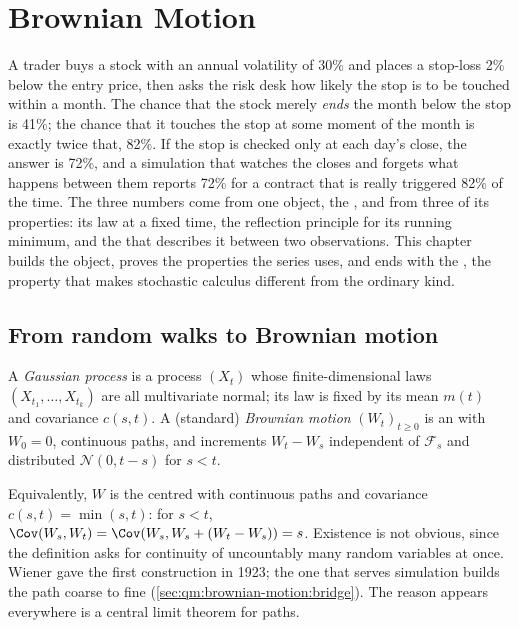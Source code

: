 \chapter{Brownian Motion}\label{ch:qm:brownian-motion}

A trader buys a stock with an annual volatility of 30\% and places a stop-loss 2\% below the
entry price, then asks the risk desk how likely the stop is to be touched within a month. The
chance that the stock merely \emph{ends} the month below the stop is 41\%; the chance that it
touches the stop at some moment of the month is exactly twice that, 82\%. If the stop is
checked only at each day's close, the answer is 72\%, and a simulation that watches the
closes and forgets what happens between them reports 72\% for a contract that is really
triggered 82\% of the time. The three numbers come from one object, the , and
from three of its properties: its law at a fixed time, the reflection principle for its
running minimum, and the  that describes it between two observations. This
chapter builds the object, proves the properties the series uses, and ends with the
, the property that makes stochastic calculus different from the
ordinary kind.

\section{From random walks to Brownian motion}

\begin{definition}\label{def:qm:brownian-motion:bm}
A \emph{Gaussian process} is a process $(X_t)$ whose finite-dimensional
laws $(X_{t_1}, \dots, X_{t_k})$ are all multivariate normal; its law is fixed by its mean
$m(t)$ and covariance $c(s,t)$. A (standard) \emph{Brownian motion}
$(W_t)_{t \ge 0}$ is an  with $W_0 = 0$, continuous paths, and increments
$W_t - W_s$ independent of $\mathcal F_s$ and distributed $\mathcal N(0, t - s)$ for $s < t$.
\end{definition}

Equivalently, $W$ is the centred  with continuous paths and covariance
$c(s,t) = \min(s,t)$: for $s < t$, $\Cov(W_s, W_t) = \Cov(W_s, W_s + (W_t - W_s)) = s$.
Existence is not obvious, since the definition asks for continuity of uncountably many
random variables at once. Wiener gave the first construction in 1923; the one that serves
simulation builds the path coarse to fine (\cref{sec:qm:brownian-motion:bridge}). The reason
 appears everywhere is a central limit theorem for paths.

